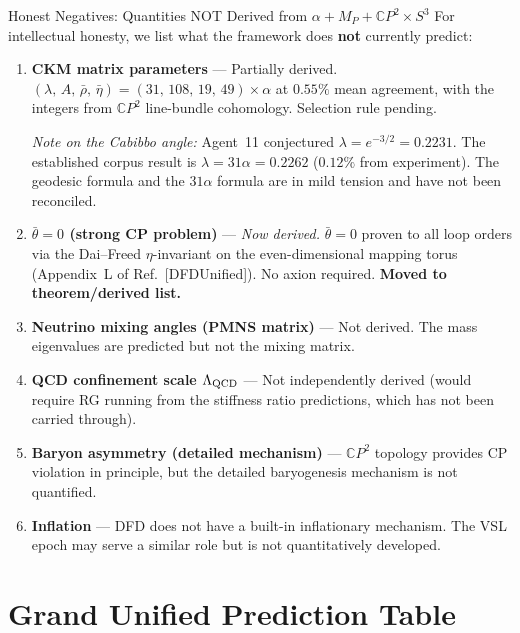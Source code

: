 \documentclass[12pt,a4paper]{article}
\newcommand{\CP}{\mathbb{C}P}
\begin{document}
\begin{honestbox}{Honest Negatives: Quantities NOT Derived from $\alpha + M_P + \CP^2 \times S^3$}
For intellectual honesty, we list what the framework does \textbf{not}
currently predict:

\begin{enumerate}[nosep]
\item \textbf{CKM matrix parameters} --- Partially derived.
  $(\lambda,\, A,\, \bar{\rho},\, \bar{\eta})
  = (31,\, 108,\, 19,\, 49) \times \alpha$ at $0.55\%$ mean agreement,
  with the integers from $\CP^2$ line-bundle cohomology.
  Selection rule pending.

  \textit{Note on the Cabibbo angle:}
  Agent~11 conjectured $\lambda = e^{-3/2} = 0.2231$.  The established
  corpus result is $\lambda = 31\alpha = 0.2262$ ($0.12\%$ from
  experiment).  The geodesic formula and the $31\alpha$ formula are in
  mild tension and have not been reconciled.

\item \textbf{$\bar{\theta} = 0$ (strong CP problem)} --- \textit{Now derived.}
  $\bar{\theta} = 0$ proven to all loop orders via the Dai--Freed
  $\eta$-invariant on the even-dimensional mapping torus
  (Appendix~L of Ref.~[DFDUnified]).  No axion required.
  \textbf{Moved to theorem/derived list.}

\item \textbf{Neutrino mixing angles (PMNS matrix)} --- Not derived.
  The mass eigenvalues are predicted but not the mixing matrix.

\item \textbf{QCD confinement scale $\Lambda_{\rm QCD}$} --- Not
  independently derived (would require RG running from the stiffness
  ratio predictions, which has not been carried through).

\item \textbf{Baryon asymmetry (detailed mechanism)} --- $\CP^2$ topology
  provides CP violation in principle, but the detailed baryogenesis
  mechanism is not quantified.

\item \textbf{Inflation} --- DFD does not have a built-in inflationary
  mechanism.  The VSL epoch may serve a similar role but is not
  quantitatively developed.
\end{enumerate}
\end{honestbox}

\section{Grand Unified Prediction Table}
\label{sec:grand-table}
\end{document}

